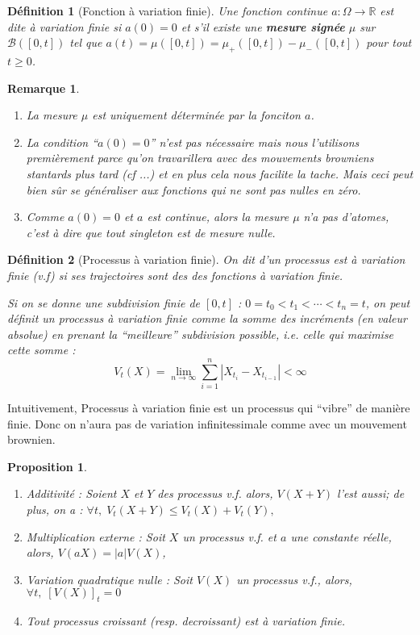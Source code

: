 \documentclass[openany]{book}
\newcommand{\R}{\mathbb{R}}
\newcommand{\1}{\mathbbm{1}}
\theoremstyle{thmfont}
\theoremstyle{deffont}
\newtheorem{definition}[definition]{Définition}
\theoremstyle{thmfont}
\newtheorem{prop}[prop]{Proposition}
\theoremstyle{deffont}
\newtheorem*{remark}{Remarque}
\begin{document}
\begin{definition}[Fonction à variation finie] Une fonction continue $a : \Omega \rightarrow \R$ est dite \textit{à variation finie} si $a(0) = 0$ et s'il existe une \textbf{mesure signée} $\mu$ sur $\mathcal B([0,t])$ tel que $a(t) = \mu([0,t]) = \mu_+([0,t]) - \mu_-([0,t])$ pour tout $t \geq 0$.
\label{def:fct_var_finie}
\end{definition}

\begin{remark}
  \begin{enumerate}
  \item La mesure $\mu$ est uniquement déterminée par la fonciton $a$.
  \item La condition ``$a(0)=0$'' n'est pas nécessaire mais nous l'utilisons premièrement parce qu'on travarillera avec des mouvements browniens stantards plus tard {\color{red}(cf ...)} et en plus cela nous facilite la tache. Mais ceci peut bien sûr se généraliser aux fonctions qui ne sont pas nulles en zéro.
  \item Comme $a(0) = 0$ et $a$ est continue, alors la mesure $\mu$ n'a pas d'\textit{atomes}, c'est à dire que tout singleton est de mesure nulle.
  \end{enumerate}
\end{remark}

\begin{definition}[Processus à variation finie]
  On dit d'un processus est \textit{à variation finie} (v.f) si ses trajectoires sont des des fonctions à variation finie.

  Si on se donne une subdivision finie de $[0,t]$ :  $0 = t_0 < t_1 < \cdots < t_n = t$, on peut définit un processus à variation finie comme la somme des incréments (en valeur absolue) en prenant la ``meilleure'' subdivision possible, i.e. celle qui maximise cette somme :
  $$ V_t(X) = \lim_{n \to \infty} \sum_{i=1}^n |X_{t_i} - X_{t_{i-1}}| < \infty$$
\end{definition}

Intuitivement, Processus à variation finie est un processus qui ``vibre'' de manière finie. Donc on n'aura pas de variation infinitessimale comme avec un mouvement brownien.

\begin{prop}
  \begin{enumerate}[nosep]
  \item Additivité : Soient $X$ et $Y$ des processus v.f. alors, $V(X+Y)$ l'est aussi; de plus, on a : $\forall t, \; V_t(X+Y) \leq V_t(X)+V_t(Y),$
  \item Multiplication externe : Soit $X$ un processus v.f. et $a$ une constante réelle, alors, $V(aX) = |a| V(X)$,
  \item Variation quadratique nulle : Soit $V(X)$ un processus v.f., alors,\\ $\forall t,\; [V(X)]_t=0$
  \item Tout processus croissant (resp. decroissant) est à variation finie.
  \end{enumerate}
\end{prop}
\end{document}
